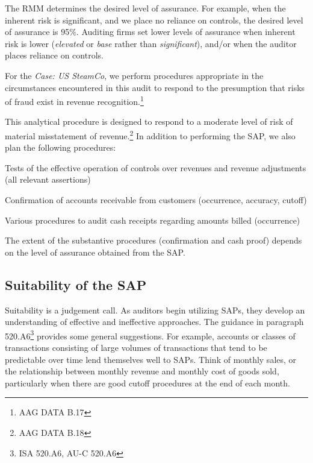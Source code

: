 The RMM determines the desired level of assurance. For example, when the inherent risk is significant, and we place no reliance on controls, the desired level of assurance is 95\%. Auditing firms set lower levels of assurance when inherent risk is lower (\emph{elevated} or \emph{base} rather than \emph{significant}), and/or when the auditor places reliance on controls.

For the \textit{Case: US SteamCo}, we perform procedures appropriate in the circumstances encountered in this audit to respond to the presumption that risks of fraud exist in revenue recognition.\footnote{AAG DATA B.17}

This analytical procedure is designed to respond to a moderate level of risk of material misstatement of revenue.\footnote{AAG DATA B.18} 
In addition to performing the SAP, we also plan the following procedures:

\begin{compactitem}
\item Tests of the effective operation of controls over revenues and revenue adjustments (all relevant assertions)
\item Confirmation of accounts receivable from customers (occurrence, accuracy, cutoff)
\item Various procedures to audit cash receipts regarding amounts billed (occurrence) 
\end{compactitem}

The extent of the substantive procedures (confirmation and cash proof) depends on the level of assurance obtained from the SAP.


\subsection{Suitability of the SAP} %
\label{sub:suitability_of_the_sap}

Suitability is a judgement call. As auditors begin utilizing SAPs, they develop an understanding of effective and ineffective approaches. The guidance in paragraph 520.A6\footnote{ISA 520.A6, AU-C 520.A6} provides some general suggestions. For example, accounts or classes of transactions consisting of large volumes of transactions that tend to be predictable over time lend themselves well to SAPs. Think of monthly sales, or the relationship between monthly revenue and monthly cost of goods sold, particularly when there are good cutoff procedures at the end of each month. 

